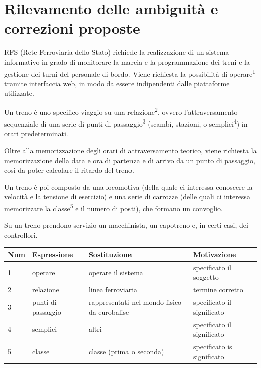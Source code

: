 \documentclass[a4paper,12pt]{report}
\begin{document}
	\section{Rilevamento delle ambiguità e correzioni proposte}
	\par RFS (Rete Ferroviaria dello Stato) richiede la realizzazione di un sistema informativo in grado di monitorare la marcia e la programmazione dei treni e la gestione dei turni del personale di bordo. Viene richiesta la possibilità di operare\textsuperscript{1} tramite interfaccia web, in modo da essere indipendenti dalle piattaforme utilizzate.
	\par Un treno è uno specifico viaggio su una relazione\textsuperscript{2}, ovvero l'attraversamento sequenziale di una serie di punti di passaggio\textsuperscript{3} (scambi, stazioni, o semplici\textsuperscript{4}) in orari predeterminati.
	\par Oltre alla memorizzazione degli orari di attraversamento teorico, viene richiesta la memorizzazione della data e ora di partenza e di arrivo da un punto di passaggio, così da poter calcolare il ritardo del treno.
	\par Un treno è poi composto da una locomotiva (della quale ci interessa conoscere la velocità e la tensione di esercizio) e una serie di carrozze (delle quali ci interessa memorizzare la classe\textsuperscript{5} e il numero di posti), che formano un convoglio.
	\par Su un treno prendono servizio un macchinista, un capotreno e, in certi casi, dei controllori.

	\begin{tabular}{|p{1cm}|p{3cm}|p{4cm}|p{4cm}|}
		\hline
		Num & Espressione & Sostituzione & Motivazione \\ \hline
		1 & operare & operare il sistema & specificato il soggetto \\ \hline
		2 & relazione & linea ferroviaria & termine corretto \\ \hline
		3 & punti di passaggio & rappresentati nel mondo fisico da eurobalise & specificato il significato \\ \hline
		4 & semplici & altri & specificato il significato \\ \hline
		5 & classe & classe (prima o seconda) & specificato is significato \\ \hline
	\end{tabular}
\end{document}
